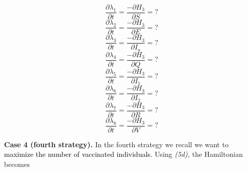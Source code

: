 \documentclass[a4paper]{article}
\begin{document}
\begin{equation*}
\frac{{\partial}\lambda _1}{{\partial}t}=\frac{-{\partial}H_3}{{\partial}S}=?
\end{equation*}
\begin{equation*}
\frac{{\partial}\lambda _2}{{\partial}t}=\frac{-{\partial}H_3}{{\partial}E}=?
\end{equation*}
\begin{equation*}
\frac{{\partial}\lambda _3}{{\partial}t}=\frac{-{\partial}H_3}{{\partial}I_a}=?
\end{equation*}
\begin{equation*}
\frac{{\partial}\lambda _4}{{\partial}t}=\frac{-{\partial}H_3}{{\partial}Q}=?
\end{equation*}
\begin{equation*}
\frac{{\partial}\lambda _5}{{\partial}t}=\frac{-{\partial}H_3}{{\partial}I_1}=?
\end{equation*}
\begin{equation*}
\frac{{\partial}\lambda _6}{{\partial}t}=\frac{-{\partial}H_3}{{\partial}I_2}=?
\end{equation*}
\begin{equation*}
\frac{{\partial}\lambda _7}{{\partial}t}=\frac{-{\partial}H_3}{{\partial}R}=?
\end{equation*}
\begin{equation*}
\frac{{\partial}\lambda _8}{{\partial}t}=\frac{-{\partial}H_3}{{\partial}V}=?
\end{equation*}

\bigskip

\textbf{Case 4 (fourth strategy). }In the fourth strategy we recall we want to \textcolor{black}{maximize the number of
vaccinated individuals. }Using \textit{(5d), }the Hamiltonian becomes
\end{document}
